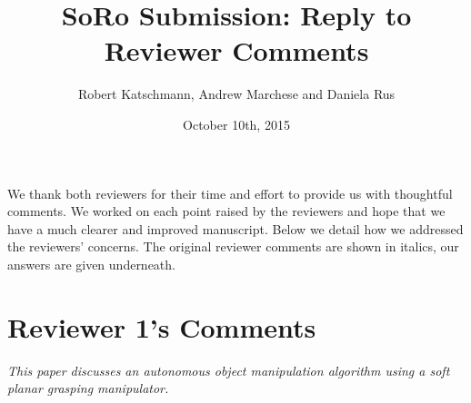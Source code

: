 \documentclass[letterpaper, 10 pt, twocolumn, conference]{article}
\begin{document}
\title{SoRo Submission: Reply to Reviewer Comments}
\author{Robert Katschmann, Andrew Marchese and Daniela Rus}
\date{October 10th, 2015}
\maketitle

We thank both reviewers for their time and effort to provide us with thoughtful comments. We worked on each point raised by the reviewers and hope that we have a much clearer and improved manuscript. Below we detail how we addressed the reviewers’ concerns. The original reviewer comments are shown in italics, our answers are given underneath. 


\section{Reviewer 1's Comments}

\textit{This paper discusses an autonomous object manipulation algorithm using a soft planar grasping manipulator.}
\end{document}
